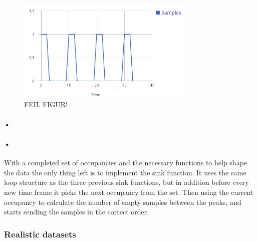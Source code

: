 \documentclass[a4paper, 12pt]{report}\dfrac{\right }{•}
\begin{document}
\begin{figure}[h!]
	\centering
		\includegraphics[width=0.75\textwidth]{images/normal-data-shape.png}
		\caption{FEIL FIGUR!}
		\label{fig:normal-data-shape}
\end{figure}

\paragraph{•}
\begin{minipage}{\linewidth}

\end{minipage}

\paragraph{•}
With a completed set of occupancies and the necessary functions to help shape the data the only thing left is to implement the sink function.
It uses the same loop structure as the three previous sink functions, but in addition before every new time frame it picks the next occupancy from the set.
Then using the current occupancy to calculate the number of empty samples between the peaks, and starts sending the samples in the correct order.

\subsubsection{Realistic datasets}
\label{subsubsec:real-data}
\end{document}
